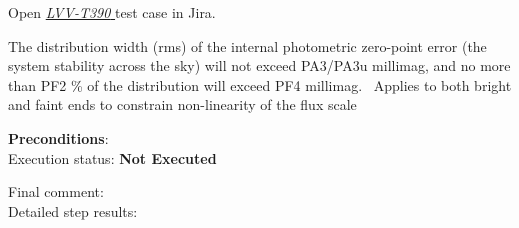 \documentclass[DM,lsstdraft,STR,toc]{lsstdoc}
\begin{document}
Open  \href{https://jira.lsstcorp.org/secure/Tests.jspa#/testCase/LVV-T390}{\textit{ LVV-T390 } }
test case in Jira.

    The distribution width (rms) of the internal photometric zero-point
error (the system stability across the sky) will not exceed PA3/PA3u
millimag, and no more than PF2 \% of the distribution will exceed PF4
millimag. ~Applies to both bright and faint ends to constrain
non-linearity of the flux scale


    \textbf{ Preconditions}:\\
    

    Execution status: {\bf Not Executed }

    Final comment:\\


    Detailed step results:
\end{document}

